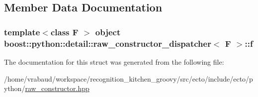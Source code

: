 \subsection{\-Member \-Data \-Documentation}
\hypertarget{structboost_1_1python_1_1detail_1_1raw__constructor__dispatcher_a055de51d7e8492c050508aa131ec1dd5}{
\subsubsection[{f}]{\setlength{\rightskip}{0pt plus 5cm}template$<$class F $>$ object {\bf boost\-::python\-::detail\-::raw\-\_\-constructor\-\_\-dispatcher}$<$ \-F $>$\-::{\bf f}}}\label{structboost_1_1python_1_1detail_1_1raw__constructor__dispatcher_a055de51d7e8492c050508aa131ec1dd5}


\-The documentation for this struct was generated from the following file\-:\begin{DoxyCompactItemize}
\item 
/home/vrabaud/workspace/recognition\-\_\-kitchen\-\_\-groovy/src/ecto/include/ecto/python/\hyperlink{raw__constructor_8hpp}{raw\-\_\-constructor.\-hpp}\end{DoxyCompactItemize}

